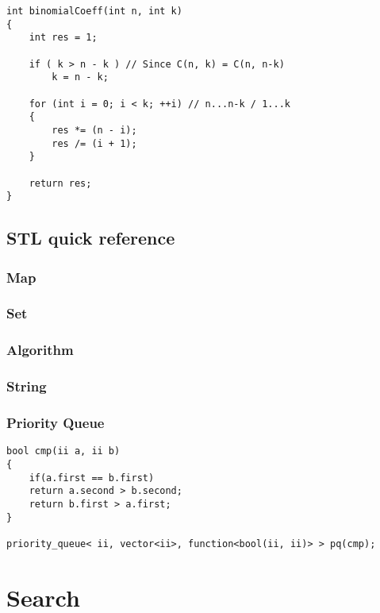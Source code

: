 \documentclass[10pt,oneside]{article}
\begin{document}
\begin{landscape}
\begin{multicols}{2}
\begin{lstlisting}
int binomialCoeff(int n, int k)
{
    int res = 1;
 
    if ( k > n - k ) // Since C(n, k) = C(n, n-k)
        k = n - k;
 
    for (int i = 0; i < k; ++i) // n...n-k / 1...k
    {
        res *= (n - i);
        res /= (i + 1);
    }
 
    return res;
}
\end{lstlisting}

\subsection{STL quick reference}

\subsubsection{Map}


\subsubsection{Set}


\subsubsection{Algorithm}


\subsubsection{String}

\subsubsection{Priority Queue}

\begin{lstlisting}
bool cmp(ii a, ii b)
{
    if(a.first == b.first)
	return a.second > b.second;
    return b.first > a.first;
}

priority_queue< ii, vector<ii>, function<bool(ii, ii)> > pq(cmp);
\end{lstlisting}


\section{Search}


\end{multicols}
\end{landscape}
\end{document}
